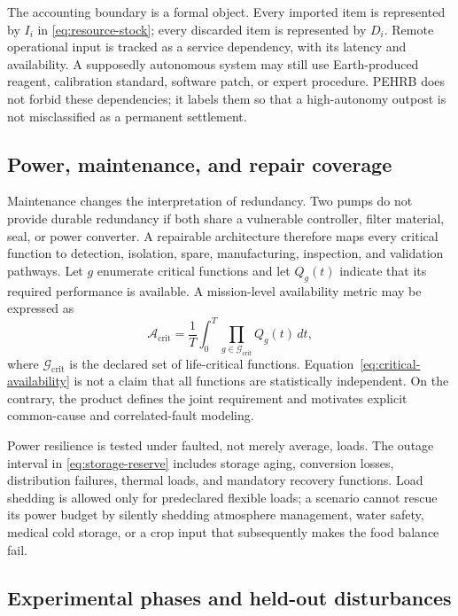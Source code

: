 \documentclass[10pt,conference]{IEEEtran}
\begin{document}
The accounting boundary is a formal object. Every imported item is represented by $I_i$ in \eqref{eq:resource-stock}; every discarded item is represented by $D_i$. Remote operational input is tracked as a service dependency, with its latency and availability. A supposedly autonomous system may still use Earth-produced reagent, calibration standard, software patch, or expert procedure. PEHRB does not forbid these dependencies; it labels them so that a high-autonomy outpost is not misclassified as a permanent settlement.

\subsection{Power, maintenance, and repair coverage}

Maintenance changes the interpretation of redundancy. Two pumps do not provide durable redundancy if both share a vulnerable controller, filter material, seal, or power converter. A repairable architecture therefore maps every critical function to detection, isolation, spare, manufacturing, inspection, and validation pathways. Let $g$ enumerate critical functions and let $Q_g(t)$ indicate that its required performance is available. A mission-level availability metric may be expressed as
\begin{equation}
\mathcal{A}_{\mathrm{crit}}=\frac{1}{T}\int_0^T\prod_{g\in\mathcal{G}_{\mathrm{crit}}}Q_g(t)\,dt,
\label{eq:critical-availability}
\end{equation}
where $\mathcal{G}_{\mathrm{crit}}$ is the declared set of life-critical functions. Equation~\eqref{eq:critical-availability} is not a claim that all functions are statistically independent. On the contrary, the product defines the joint requirement and motivates explicit common-cause and correlated-fault modeling.

Power resilience is tested under faulted, not merely average, loads. The outage interval in \eqref{eq:storage-reserve} includes storage aging, conversion losses, distribution failures, thermal loads, and mandatory recovery functions. Load shedding is allowed only for predeclared flexible loads; a scenario cannot rescue its power budget by silently shedding atmosphere management, water safety, medical cold storage, or a crop input that subsequently makes the food balance fail.

\subsection{Experimental phases and held-out disturbances}
\end{document}

